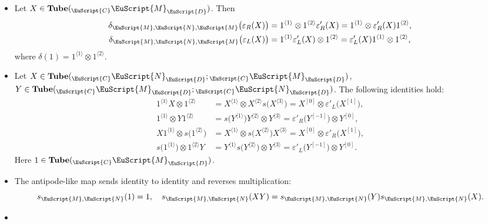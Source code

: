 \documentclass[a4paper,11pt]{article}
\theoremstyle{definition}
\theoremstyle{remark}
\newcommand\eC           {\EuScript{C}}
\newcommand\eD           {\EuScript{D}}
\newcommand\eM          {\EuScript{M}}
\newcommand\eN         {\EuScript{N}}
\newcommand{\Tube}{\mathbf{Tube}}
\begin{document}
\begin{itemize}
    \item
    Let $X\in\Tube({}_{\eC}\eM_{\eD})$. Then 
    \begin{align}
        \delta_{\eM,\eN,\eM}\bigl(\varepsilon_R(X)\bigr) & = 1^{\langle 1\rangle}\otimes 1^{\langle 2\rangle}\varepsilon'_R(X) =  1^{\langle 1\rangle} \otimes \varepsilon'_R(X)1^{\langle 2\rangle},  \label{eq:epsilon-rho-DW-1} \\
        \delta_{\eM,\eN,\eM}\bigl(\varepsilon_L(X)\bigr) & = 1^{\langle 1\rangle}\varepsilon'_L(X)  \otimes 1^{\langle 2\rangle} = \varepsilon'_L(X)1^{\langle 1\rangle} \otimes  1^{\langle 2\rangle}, \label{eq:epsilon-rho-DW-2}
    \end{align}
    where $\delta(1)=1^{\langle 1\rangle} \otimes 1^{\langle 2\rangle}$. 
    \item
    Let $X\in \Tube({}_{\eC}\eN_{\eD};{}_{\eC}\eM_{\eD})$, $Y\in \Tube({}_{\eC}\eM_{\eD};{}_{\eC}\eN_{\eD})$. The following identities hold:
    \begin{align}
        1^{\langle 1\rangle}X  \otimes 1^{\langle 2\rangle} &= X^{\langle 1\rangle} \otimes X^{\langle 2\rangle} s\bigl(X^{\langle 3\rangle}\bigr) = X^{[0]} \otimes  \varepsilon'_L\bigl(X^{[1]}\bigr), \label{eq:unit-counit-DW-1} \\
        1^{\langle 1\rangle} \otimes Y1^{\langle 2\rangle} &=  s\bigl(Y^{\langle 1\rangle}\bigr) Y^{\langle 2\rangle} \otimes  Y^{\langle 3\rangle} = \varepsilon'_R\bigl(Y^{[-1]}\bigr) \otimes Y^{[0]},  \label{eq:unit-counit-DW-2} \\
        X1^{\langle 1\rangle} \otimes  s\bigl(1^{\langle 2\rangle}\bigr)  &=
        X^{\langle 1\rangle} \otimes s\bigl(X^{\langle 2\rangle}\bigr)  X^{\langle 3\rangle} = X^{[0]} \otimes \varepsilon'_R\bigl(X^{[1]}\bigr), \label{eq:unit-counit-DW-3} \\
        s\bigl(1^{\langle 1\rangle}\bigr) \otimes 1^{\langle 2\rangle}Y &= Y^{\langle 1\rangle} s\bigl(Y^{\langle 2\rangle}\bigr) \otimes Y^{\langle 3\rangle} = \varepsilon'_L\bigl(Y^{[-1]}\bigr) \otimes    Y^{[0]}. \label{eq:unit-counit-DW-4}
    \end{align}
    Here $1\in\Tube({}_{\eC}\eM_{\eD})$. 
    \item
    The antipode-like map sends identity to identity and reverses
    multiplication:
    \begin{equation}
        s_{\eM,\eN}(1)=1, \quad s_{\eM,\eN}(XY) = s_{\eM,\eN}(Y)s_{\eM,\eN}(X). \label{eq:antipode-antimultiplicative-DW} 
    \end{equation}
    \item

\end{itemize}
\end{document}
